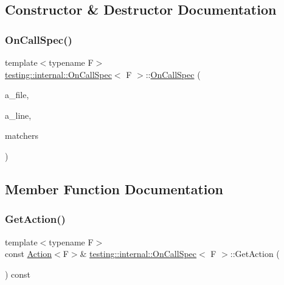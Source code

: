 \subsection{Constructor \& Destructor Documentation}
\mbox{\label{classtesting_1_1internal_1_1_on_call_spec_ac7077e8162a10714e463b64a3cc7d054}} 
\subsubsection{\texorpdfstring{On\+Call\+Spec()}{OnCallSpec()}}
{\footnotesize\ttfamily template$<$typename F$>$ \\
\hyperlink{classtesting_1_1internal_1_1_on_call_spec}{testing\+::internal\+::\+On\+Call\+Spec}$<$ F $>$\+::\hyperlink{classtesting_1_1internal_1_1_on_call_spec}{On\+Call\+Spec} (\begin{DoxyParamCaption}\item[{const char $\ast$}]{a\+\_\+file,  }\item[{int}]{a\+\_\+line,  }\item[{const \hyperlink{classtesting_1_1internal_1_1_on_call_spec_a3240f159f0a9d8cda208bc256da35074}{Argument\+Matcher\+Tuple} \&}]{matchers }\end{DoxyParamCaption})\hspace{0.3cm}{\ttfamily [inline]}}



\subsection{Member Function Documentation}
\mbox{\label{classtesting_1_1internal_1_1_on_call_spec_a3ef8e41380326823fb5b701f3c52cdb6}} 
\subsubsection{\texorpdfstring{Get\+Action()}{GetAction()}}
{\footnotesize\ttfamily template$<$typename F$>$ \\
const \hyperlink{classtesting_1_1_action}{Action}$<$F$>$\& \hyperlink{classtesting_1_1internal_1_1_on_call_spec}{testing\+::internal\+::\+On\+Call\+Spec}$<$ F $>$\+::Get\+Action (\begin{DoxyParamCaption}{ }\end{DoxyParamCaption}) const\hspace{0.3cm}{\ttfamily [inline]}}

